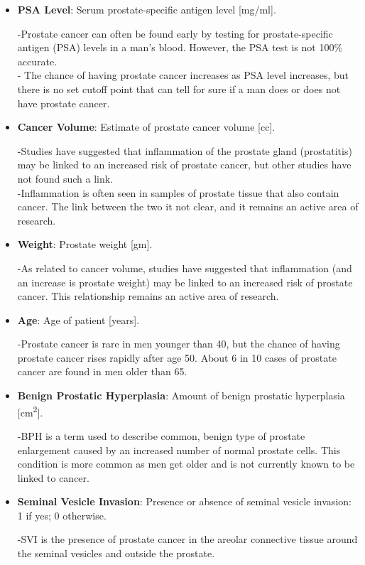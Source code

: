 \begin{itemize}
	\item \textbf{PSA Level}: Serum prostate-specific antigen level [mg/ml]. \par
		-Prostate cancer can often be found early by testing for prostate-specific antigen (PSA) levels in a man's blood. However, the PSA test is not 100\% accurate. \\
		- The chance of having prostate cancer increases as PSA level increases, but there is no set cutoff point that can tell for sure if a man does or does not have prostate cancer.
		
	\item \textbf{Cancer Volume}: Estimate of prostate cancer volume [cc]. \par
		-Studies have suggested that inflammation of the prostate gland (prostatitis) may be linked to an increased risk of prostate cancer, but other studies have not found such a link. \\
		-Inflammation is often seen in samples of prostate tissue that also contain cancer. The link between the two it not clear, and it remains an active area of research. 
		
	\item \textbf{Weight}: Prostate weight [gm]. \par
		-As related to cancer volume, studies have suggested that inflammation (and an increase is prostate weight) may be linked to an increased risk of prostate cancer. This relationship remains an active area of research.
		
	\item \textbf{Age}: Age of patient [years]. \par	
		-Prostate cancer is rare in men younger than 40, but the chance of having prostate cancer rises rapidly after age 50. About 6 in 10 cases of prostate cancer are found in men older than 65.
		
	\item \textbf{Benign Prostatic Hyperplasia}: Amount of benign prostatic hyperplasia [cm\textsuperscript{2}]. \par
		-BPH is a term used to describe common, benign type of prostate enlargement caused by an increased number of normal prostate cells. This condition is more common as men get older and is not currently known to be linked to cancer.
		
	\item \textbf{Seminal Vesicle Invasion}: Presence or absence of seminal vesicle invasion: 1 if yes; 0 otherwise. \par
		-SVI is the presence of prostate cancer in the areolar connective tissue around the seminal vesicles and outside the prostate.
		

\end{itemize}
